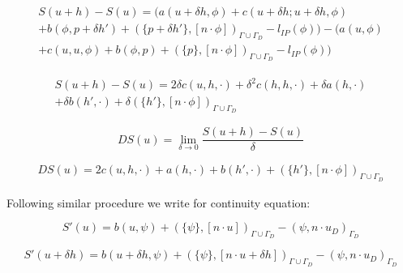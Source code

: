 \documentclass[a4paper]{book}
\begin{document}
\begin{flushleft}
\begin{equation}
\begin{split}
S(u+h) - S(u) = (a(u+\delta h,\phi) + c(u + \delta h;u + \delta h,\phi)\\ + b(\phi,p+\delta h') + (\{p+\delta h'\},[n\cdot \phi])_{\Gamma \cup \Gamma_D} - l_{IP}(\phi)) - (a(u,\phi)\\ + c(u,u,\phi) + b(\phi,p) + (\{p\},[n\cdot \phi])_{\Gamma \cup \Gamma_D} - l_{IP}(\phi))
\end{split}
\end{equation}
\end{flushleft}

\begin{flushleft}
\begin{equation}
\begin{split}
S(u+h) - S(u) = 2\delta c(u,h,\cdot) + \delta^2 c(h,h,\cdot) + \delta a(h,\cdot)\\ + \delta b(h',\cdot) + \delta (\{h'\},[n\cdot \phi])_{\Gamma \cup \Gamma_D}
\end{split}
\end{equation}
\end{flushleft}

\begin{flushleft}
\begin{equation}
DS(u) = \lim_{\delta \to 0} \frac{S(u+h)-S(u)}{\delta}
\end{equation}
\end{flushleft}

\begin{flushleft}
\begin{equation}
\begin{split}
DS(u) = 2 c(u,h,\cdot) + a(h,\cdot) + b(h',\cdot) + (\{h'\},[n\cdot \phi])_{\Gamma \cup \Gamma_D}
\end{split}
\end{equation}
\end{flushleft}

Following similar procedure we write for continuity equation:\\
\begin{flushleft}
\begin{equation}
S'(u) = b(u,\psi) + (\{\psi\},[n \cdot u])_{\Gamma \cup \Gamma_D} - (\psi,n \cdot u_D)_{\Gamma_D}
\end{equation}
\end{flushleft}

\begin{flushleft}
\begin{equation}
S'(u+\delta h) = b(u + \delta h,\psi) + (\{\psi\},[n \cdot u + \delta h])_{\Gamma \cup \Gamma_D} - (\psi,n \cdot u_D)_{\Gamma_D}
\end{equation}
\end{flushleft}
\end{document}
